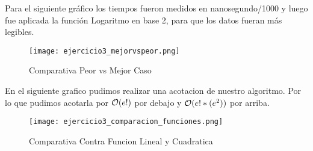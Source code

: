 Para el siguiente gr\'afico los tiempos fueron medidos en nanosegundo/1000 y luego fue aplicada la funci\'on Logaritmo en base 2, para que los datos fueran m\'as legibles.

\begin{figure}[h!]
\texttt{[image: ejercicio3\_mejorvspeor.png]}
\centering
\caption{Comparativa Peor vs Mejor Caso}
\label{overflow3}
\end{figure}

\pagebreak

En el siguiente grafico pudimos realizar una acotacion de nuestro algoritmo. Por lo que pudimos acotarla por  $\mathcal{O}(e!)$ por debajo y
$\mathcal{O}(e!*(e^2))$ por arriba.

\begin{figure}[h!]
\texttt{[image: ejercicio3\_comparacion\_funciones.png]}
\centering
\caption{Comparativa Contra Funcion Lineal y Cuadratica}
\label{overflow3}
\end{figure}

